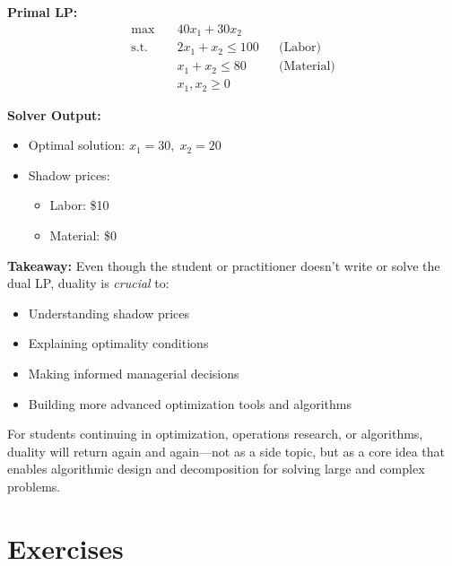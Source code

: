 \begin{tcolorbox}[colback=gray!5!white, colframe=black!75!white, title=\textbf{Duality in Practice: Why It Matters}]
\begin{minipage}{0.48\textwidth}
\textbf{Primal LP:}
\[
\begin{aligned}
\max\quad & 40x_1 + 30x_2 \\
\text{s.t.} \quad
& 2x_1 + x_2 \le 100 && \text{(Labor)} \\
& x_1 + x_2 \le 80 && \text{(Material)} \\
& x_1, x_2 \ge 0
\end{aligned}
\]
\end{minipage}
\hfill
\begin{minipage}{0.48\textwidth}
\textbf{Solver Output:}
\begin{itemize}
    \item Optimal solution: \( x_1 = 30,\; x_2 = 20 \)
    \item Shadow prices:
    \begin{itemize}
        \item Labor: \$10
        \item Material: \$0
    \end{itemize}
\end{itemize}
\end{minipage}

\medskip

\noindent\textbf{Takeaway:}
Even though the student or practitioner doesn't write or solve the dual LP, duality is \emph{crucial} to:
\begin{itemize}
    \item Understanding shadow prices
    \item Explaining optimality conditions
    \item Making informed managerial decisions
    \item Building more advanced optimization tools and algorithms
\end{itemize}

For students continuing in optimization, operations research, or algorithms, duality will return again and again—not as a side topic, but as a core idea that enables algorithmic design and decomposition for solving large and complex problems.
\end{tcolorbox}


\section{Exercises}

